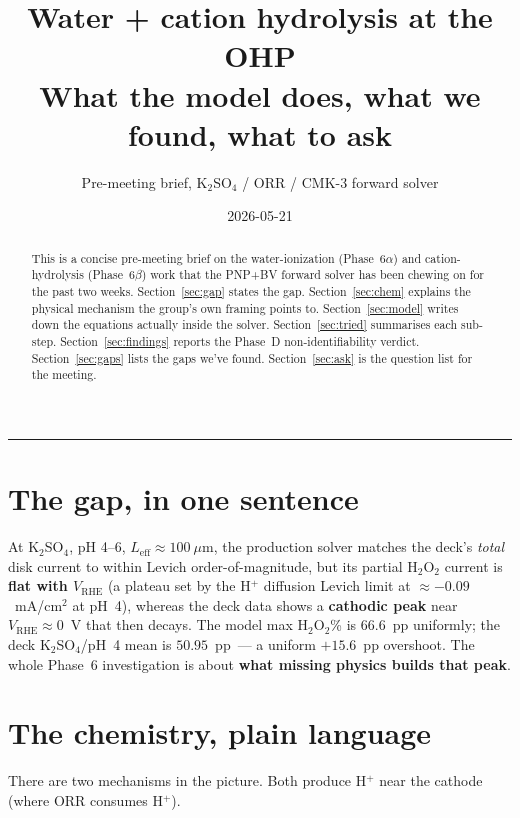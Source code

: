 \documentclass[11pt]{article}
\title{\bfseries Water + cation hydrolysis at the OHP\\[2pt]
       \large{\normalfont What the model does, what we found, what to ask}}
\author{\normalsize Pre-meeting brief, K$_2$SO$_4$ / ORR / CMK-3 forward solver}
\date{2026-05-21}
\begin{document}
\maketitle

\begin{abstract}\noindent
This is a concise pre-meeting brief on the water-ionization
(Phase~6$\alpha$) and cation-hydrolysis (Phase~6$\beta$) work that
the PNP+BV forward solver has been chewing on for the past two
weeks.  Section~\ref{sec:gap} states the gap.  Section~\ref{sec:chem}
explains the physical mechanism the group's own framing points to.
Section~\ref{sec:model} writes down the equations actually inside the
solver.  Section~\ref{sec:tried} summarises each sub-step.
Section~\ref{sec:findings} reports the Phase~D non-identifiability
verdict.  Section~\ref{sec:gaps} lists the gaps we've found.
Section~\ref{sec:ask} is the question list for the meeting.
\end{abstract}

\hrule\vspace{0.3em}

\section{The gap, in one sentence}
\label{sec:gap}

At K$_2$SO$_4$, pH 4--6, $L_{\mathrm{eff}}\approx 100~\mu$m, the
production solver matches the deck's \emph{total} disk current to
within Levich order-of-magnitude, but its partial H$_2$O$_2$ current is
\textbf{flat with $V_{\mathrm{RHE}}$} (a plateau set by the H$^+$
diffusion Levich limit at $\approx -0.09$~mA/cm$^2$ at pH~4), whereas
the deck data shows a \textbf{cathodic peak} near $V_{\mathrm{RHE}}
\approx 0$~V that then decays.  The model max H$_2$O$_2$\% is
$66.6$~pp uniformly; the deck K$_2$SO$_4$/pH~4 mean is
$50.95$~pp~--- a uniform $+15.6$~pp overshoot.  The whole Phase~6
investigation is about \textbf{what missing physics builds that
peak}.

\section{The chemistry, plain language}
\label{sec:chem}

There are two mechanisms in the picture.  Both produce H$^+$ near the
cathode (where ORR consumes H$^+$).
\end{document}
